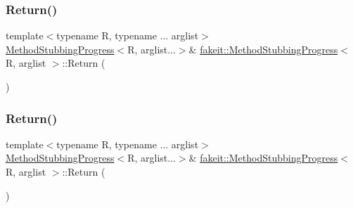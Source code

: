 \mbox{\label{structfakeit_1_1MethodStubbingProgress_a4743b7e25e98cd6a2be2c03b7a9416d4}} 
\subsubsection{\texorpdfstring{Return()}{Return()}\hspace{0.1cm}{\footnotesize\ttfamily [36/45]}}
{\footnotesize\ttfamily template$<$typename R, typename ... arglist$>$ \\
\mbox{\hyperlink{structfakeit_1_1MethodStubbingProgress}{Method\+Stubbing\+Progress}}$<$R, arglist...$>$\& \mbox{\hyperlink{structfakeit_1_1MethodStubbingProgress}{fakeit\+::\+Method\+Stubbing\+Progress}}$<$ R, arglist $>$\+::Return (\begin{DoxyParamCaption}{ }\end{DoxyParamCaption})\hspace{0.3cm}{\ttfamily [inline]}}

\mbox{\label{structfakeit_1_1MethodStubbingProgress_a4743b7e25e98cd6a2be2c03b7a9416d4}} 
\subsubsection{\texorpdfstring{Return()}{Return()}\hspace{0.1cm}{\footnotesize\ttfamily [37/45]}}
{\footnotesize\ttfamily template$<$typename R, typename ... arglist$>$ \\
\mbox{\hyperlink{structfakeit_1_1MethodStubbingProgress}{Method\+Stubbing\+Progress}}$<$R, arglist...$>$\& \mbox{\hyperlink{structfakeit_1_1MethodStubbingProgress}{fakeit\+::\+Method\+Stubbing\+Progress}}$<$ R, arglist $>$\+::Return (\begin{DoxyParamCaption}{ }\end{DoxyParamCaption})\hspace{0.3cm}{\ttfamily [inline]}}


